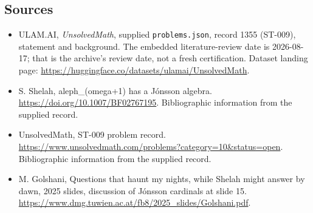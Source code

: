 \documentclass[11pt,a4paper]{article}
\begin{document}
\subsection{Sources}

{\small

\begin{itemize}

\item[\hypertarget{source:1355:1}{S1}] ULAM.AI, \emph{UnsolvedMath}, supplied \texttt{problems.json}, record 1355 (ST-009), statement and background. The embedded literature-review date is 2026-08-17; that is the archive’s review date, not a fresh certification. Dataset landing page: \url{https://huggingface.co/datasets/ulamai/UnsolvedMath}.

\item[\hypertarget{source:1355:2}{S2}] S. Shelah, aleph\_(omega+1) has a Jónsson algebra. \url{https://doi.org/10.1007/BF02767195}. Bibliographic information from the supplied record.

\item[\hypertarget{source:1355:3}{S3}] UnsolvedMath, ST-009 problem record. \url{https://www.unsolvedmath.com/problems?category=10&status=open}. Bibliographic information from the supplied record.

\item[R1] M. Golshani, Questions that haunt my nights, while Shelah might answer by dawn, 2025 slides, discussion of Jónsson cardinals at slide 15.
\url{https://www.dmg.tuwien.ac.at/fb8/2025_slides/Golshani.pdf}.
\end{itemize}

}

\label{end:1355}
\end{document}
